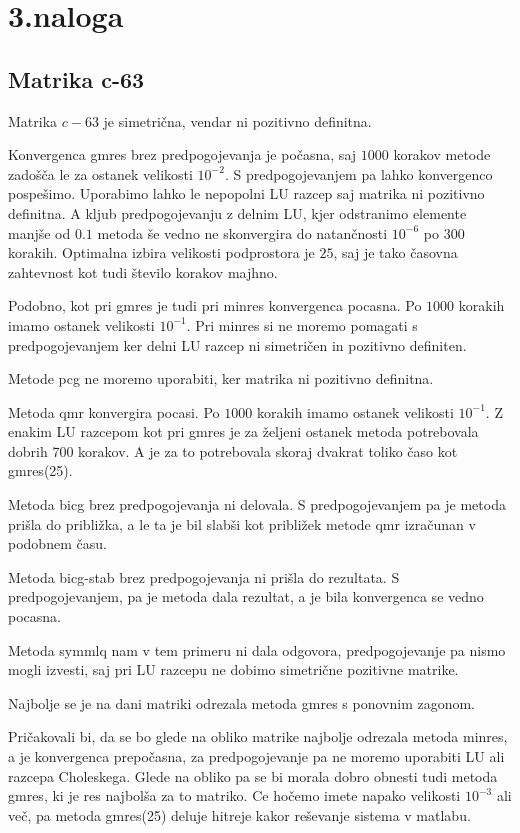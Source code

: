 \documentclass[11pt]{article} %
\begin{document}
\section{3.naloga}

\subsection{Matrika c-63}

Matrika $c-63$ je simetrična, vendar ni pozitivno definitna.

 Konvergenca gmres brez predpogojevanja je počasna, saj $1000$ korakov metode zadošča le za ostanek velikosti $10^{-2}$. S predpogojevanjem pa lahko konvergenco pospešimo. Uporabimo lahko le nepopolni LU razcep saj matrika ni pozitivno definitna. A kljub predpogojevanju z delnim LU, kjer odstranimo elemente manjše od $0.1$ metoda še vedno ne skonvergira do natančnosti $10^{-6}$ po $300$ korakih. Optimalna izbira velikosti podprostora je $25$, saj je tako časovna zahtevnost kot tudi število korakov majhno.

 Podobno, kot pri gmres je tudi pri minres konvergenca pocasna. Po $1000$ korakih imamo ostanek velikosti $10^{-1}$. Pri minres si ne moremo pomagati s predpogojevanjem ker delni LU razcep ni  simetričen in pozitivno definiten.
 
 Metode pcg ne moremo uporabiti, ker matrika ni pozitivno definitna.
 
 Metoda qmr konvergira pocasi.  Po $1000$ korakih imamo ostanek velikosti $10^{-1}$. Z enakim LU razcepom kot pri gmres je za željeni ostanek metoda potrebovala dobrih 700 korakov. A je za to potrebovala skoraj dvakrat toliko časo kot gmres(25).
 
 Metoda bicg brez predpogojevanja ni delovala. S predpogojevanjem pa je metoda prišla do približka, a le ta je bil slabši kot približek metode qmr izračunan v podobnem času.
 
Metoda bicg-stab brez predpogojevanja ni prišla do rezultata. S predpogojevanjem, pa je metoda dala rezultat, a je bila konvergenca se vedno pocasna.

Metoda symmlq nam v tem primeru ni dala odgovora, predpogojevanje pa nismo mogli izvesti, saj pri LU razcepu ne dobimo simetrične pozitivne matrike.

Najbolje se je na dani matriki odrezala metoda gmres s ponovnim zagonom.

Pričakovali bi, da se bo glede na obliko matrike najbolje odrezala metoda minres, a je konvergenca prepočasna, za predpogojevanje pa ne moremo uporabiti LU ali razcepa Choleskega. Glede na obliko pa se bi morala dobro obnesti tudi metoda gmres, ki je res najbolša za to matriko. Ce hočemo imete napako velikosti $10^{-3}$ ali več, pa metoda gmres(25) deluje hitreje kakor reševanje sistema v matlabu.
\end{document}
